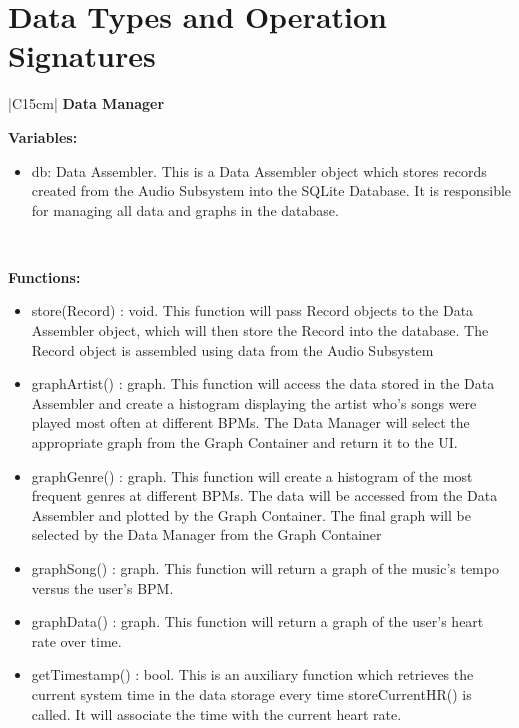 \documentclass[letterpaper,english, 12pt]{scrreprt}
\begin{document}
\section{Data Types and Operation Signatures}
\begin{center}
        \begin{tabular}{|C{15cm}|}
                \hline
                        \textbf{Data Manager}\\
                \hline
                        \begin{flushleft}
                                \textbf{Variables:} \\
                        \end{flushleft}
                                \begin{itemize}
					\item db: Data Assembler. This is a Data Assembler object which stores records created from the Audio Subsystem into the SQLite Database. It is responsible for managing all data and graphs in the database.
                                \end{itemize} \\
                        \hline
                        \begin{flushleft}
                                \textbf{Functions:} \\
                        \end{flushleft}
                                \begin{itemize}
					 \item store(Record) : void. This function will pass Record objects to the Data Assembler object, which will then store the Record into the database. The Record object is assembled using data from the Audio Subsystem
                                        \item graphArtist() : graph. This function will access the data stored in the Data Assembler and create a histogram displaying the artist who's songs were played most often at different BPMs. The Data Manager will select the appropriate graph from the Graph Container and return it to the UI.
                                        \item graphGenre() : graph. This function will create a histogram of the most frequent genres at different BPMs. The data will be accessed from the Data Assembler and plotted by the Graph Container. The final graph will be selected by the Data Manager from the Graph Container
                                        \item graphSong() : graph. This function will return a graph of the music's tempo versus the user's BPM.
                                        \item graphData() : graph. This function will return a graph of the user's heart rate over time.
                                        \item getTimestamp() : bool. This is an auxiliary function which retrieves the current system time in the data storage every time storeCurrentHR() is called. It will associate the time with the current heart rate.



\end{itemize}
\end{tabular}
\end{center}
\end{document}
